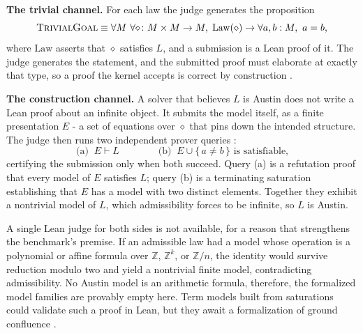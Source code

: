 \documentclass[letterpaper]{article} %
\newcommand{\op}{\diamond}
\begin{document}
\textbf{The trivial channel.} For each law the judge generates the proposition
\begin{equation}
\label{eq:trivialgoal}
\textsc{TrivialGoal} \equiv \forall M\ \forall {\op}\colon M \times M \to M,\;
\mathrm{Law}(\op) \rightarrow \forall a, b : M,\ a = b,
\end{equation}
where $\mathrm{Law}$ asserts that $\op$ satisfies $L$, and a submission is a Lean proof of it. The judge generates the statement, and the submitted proof must elaborate at exactly that type, so a proof the kernel accepts is correct by construction \citep{moura2021lean}.

\textbf{The construction channel.} A solver that believes $L$ is Austin does not write a Lean proof about an infinite object. It submits the model itself, as a finite presentation $E$ - a set of equations over $\op$ that pins down the intended structure. The judge then runs two independent prover queries
\citep{kovacs2013first}:
\begin{equation}
    \label{eq:construction}
    \text{(a)}\;\; E \vdash L
    \qquad\qquad
    \text{(b)}\;\; E \cup \{\,a \neq b\,\} \text{ is satisfiable,}
\end{equation}
certifying the submission only when both succeed. Query (a) is a refutation proof that every model of $E$ satisfies $L$; query (b) is a terminating saturation establishing that $E$ has a model with two distinct elements. Together they exhibit a nontrivial model of $L$, which admissibility forces to be infinite, so $L$ is Austin.

A single Lean judge for both sides is not available, for a reason that strengthens the benchmark's premise. If an admissible law had a model whose operation is a polynomial or affine formula over $\mathbb{Z}$, $\mathbb{Z}^k$, or $\mathbb{Z}/n$, the identity would survive reduction modulo two and yield a nontrivial finite model, contradicting admissibility. No Austin model is an arithmetic formula, therefore, the formalized model families are provably empty here. Term models built from saturations could validate such a proof in Lean, but they await a formalization of ground confluence \citep{janota2026case}.
\end{document}

